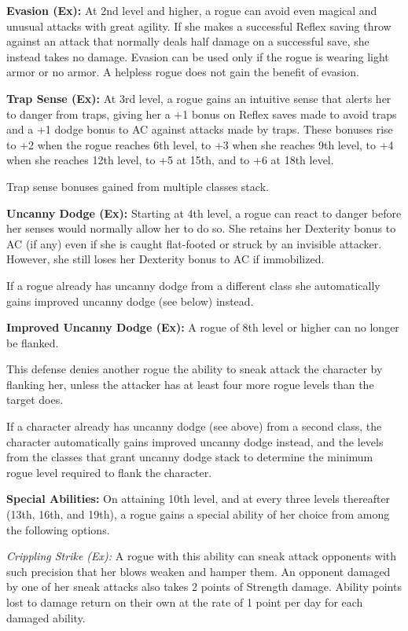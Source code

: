 \textbf{Evasion (Ex):} At 2nd level and higher, a rogue can avoid even magical and unusual attacks with great agility. If she makes a successful Reflex saving throw against an attack that normally deals half damage on a successful save, she instead takes no damage. Evasion can be used only if the rogue is wearing light armor or no armor. A helpless rogue does not gain the benefit of evasion.

\textbf{Trap Sense (Ex):} At 3rd level, a rogue gains an intuitive sense that alerts her to danger from traps, giving her a +1 bonus on Reflex saves made to avoid traps and a +1 dodge bonus to AC against attacks made by traps. These bonuses rise to +2 when the rogue reaches 6th level, to +3 when she reaches 9th level, to +4 when she reaches 12th level, to +5 at 15th, and to +6 at 18th level.

Trap sense bonuses gained from multiple classes stack.

\textbf{Uncanny Dodge (Ex):} Starting at 4th level, a rogue can react to danger before her senses would normally allow her to do so. She retains her Dexterity bonus to AC (if any) even if she is caught flat-footed or struck by an invisible attacker. However, she still loses her Dexterity bonus to AC if immobilized.

If a rogue already has uncanny dodge from a different class she automatically gains improved uncanny dodge (see below) instead.

\textbf{Improved Uncanny Dodge (Ex):} A rogue of 8th level or higher can no longer be flanked.

This defense denies another rogue the ability to sneak attack the character by flanking her, unless the attacker has at least four more rogue levels than the target does.

If a character already has uncanny dodge (see above) from a second class, the character automatically gains improved uncanny dodge instead, and the levels from the classes that grant uncanny dodge stack to determine the minimum rogue level required to flank the character.

\textbf{Special Abilities:} On attaining 10th level, and at every three levels 
thereafter (13th, 16th, and 19th), a rogue gains a special ability of her choice 
from among the following options.

\textit{Crippling Strike (Ex):} A rogue with this ability can sneak attack opponents with such precision that her blows weaken and hamper them. An opponent damaged by one of her sneak attacks also takes 2 points of Strength damage. Ability points lost to damage return on their own at the rate of 1 point per day for each damaged ability.

